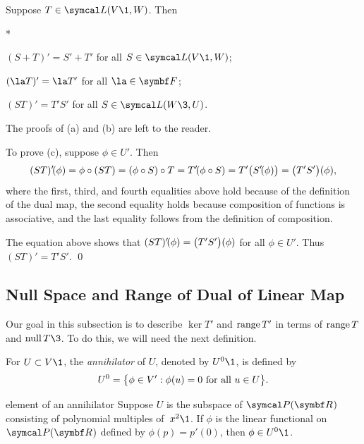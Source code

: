 {Suppose $T \in \L(V\1,W)$. Then
\begin{subtheorem}*
\item
$(S + T)' = S' + T'$ for all $S \in \L(V\1,W)$;
\item
$(\la T)' = \la T'$ for all $\la \in \F{}$;
\item
$(ST)' = T'S'$ for all $S \in \L(W\3, U)$.
\end{subtheorem}}

\proof
The proofs of (a) and (b) are left to the reader.

To prove (c), suppose $\phi \in U'\!$. Then
\[
(ST)' \! (\phi) = \phi \circ (ST) = (\phi \circ S) \circ T = T' \! (\phi \circ S) = T'\bigl(S' \! (\phi)\bigr) = \paren[\big]{T'S'}(\phi),
\]
where the first, third, and fourth equalities above hold because of the definition of the dual map, the second equality holds because composition of functions is associative, and the last equality follows from the definition of composition.

The equation above shows that $(ST)' \! (\phi) = \paren[\big]{T'S'}(\phi)$ for all $\phi \in U'\!$. Thus $(ST)' = T'S'\!$.
\qed

\subsection{Null Space and Range of Dual of Linear Map}

Our goal in this subsection is to describe $\ker T'$ and $\ran T'$ in terms of $\ran T$ and $\ker T\3$. To do this, we will need the next definition.

{For $U \subset V\1$, the \emph{annihilator} of $U$, denoted by $U^0\1$, is defined by
\[
U^0 = \br[\big]{\phi \in V': \phi(u) = 0 \text{\ for all\ } u \in U}.
\]}

\begin{example}{element of an annihilator}
Suppose $U$ is the subspace of $\P(\R{})$ consisting of polynomial multiples of~$x^2\1$. If $\phi$ is the linear functional on $\P(\R{})$ defined by $\phi(p) = p' \! (0)$, then $\phi \in U^0\1$.
\end{example}

